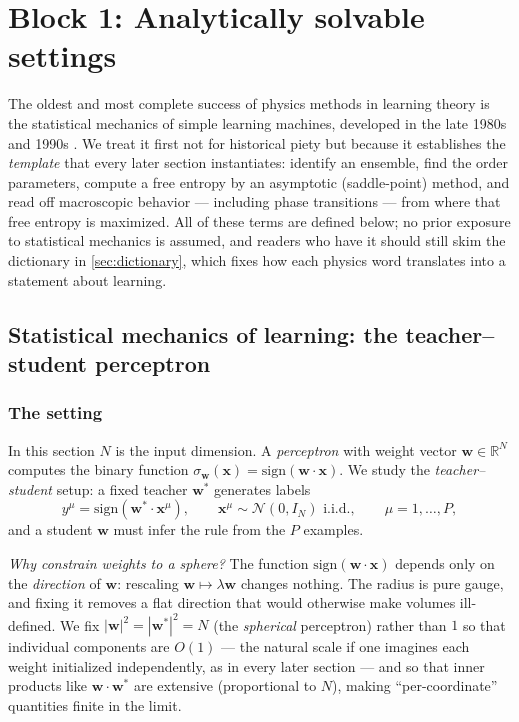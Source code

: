 \documentclass[11pt]{article}
\newcommand{\R}{\mathbb{R}}
\newcommand{\bv}[1]{\boldsymbol{#1}}
\begin{document}
\section{Block 1: Analytically solvable settings}
\label{sec:block1}

The oldest and most complete success of physics methods in learning theory
is the statistical mechanics of simple learning machines, developed in the
late 1980s and 1990s \cite{gardner1988space,seung1992statistical,
engel2001statistical}. We treat it first not for historical piety but
because it establishes the \emph{template} that every later section
instantiates: identify an ensemble, find the order parameters, compute a
free entropy by an asymptotic (saddle-point) method, and read off
macroscopic behavior --- including phase transitions --- from where that
free entropy is maximized. All of these terms are defined below; no prior
exposure to statistical mechanics is assumed, and readers who have it
should still skim the dictionary in \cref{sec:dictionary}, which fixes how
each physics word translates into a statement about learning.

\subsection{Statistical mechanics of learning: the teacher--student perceptron}
\label{sec:statmech}

\subsubsection{The setting}

In this section $N$ is the input dimension. A \emph{perceptron} with weight
vector $\bv{w} \in \R^N$ computes the binary function
$\sigma_{\bv{w}}(\bv{x}) = \mathrm{sign}(\bv{w}\cdot\bv{x})$. We study the
\emph{teacher--student} setup: a fixed teacher $\bv{w}^{*}$ generates labels
\begin{equation}
  \label{eq:teacher-data}
  y^\mu = \mathrm{sign}(\bv{w}^{*}\cdot\bv{x}^\mu),
  \qquad \bv{x}^\mu \sim \mathcal{N}(0, I_N) \text{ i.i.d.},
  \qquad \mu = 1,\dots,P,
\end{equation}
and a student $\bv{w}$ must infer the rule from the $P$ examples.

\emph{Why constrain weights to a sphere?} The function
$\mathrm{sign}(\bv{w}\cdot\bv{x})$ depends only on the \emph{direction} of
$\bv{w}$: rescaling $\bv{w} \mapsto \lambda\bv{w}$ changes nothing. The
radius is pure gauge, and fixing it removes a flat direction that would
otherwise make volumes ill-defined. We fix $|\bv{w}|^2 = |\bv{w}^*|^2 = N$
(the \emph{spherical} perceptron) rather than $1$ so that individual
components are $O(1)$ --- the natural scale if one imagines each weight
initialized independently, as in every later section --- and so that inner
products like $\bv{w}\cdot\bv{w}^*$ are extensive (proportional to $N$),
making ``per-coordinate'' quantities finite in the limit.
\end{document}
